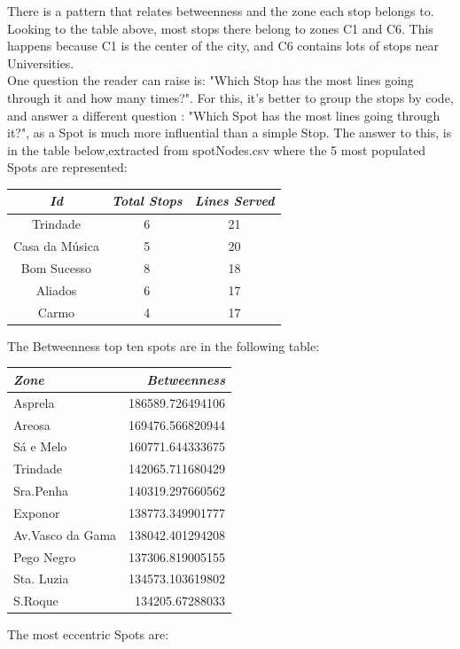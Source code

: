 \documentclass[12pt]{article}
\begin{document}
\begin{multicols}{2}
There is a pattern that relates betweenness and the zone each stop belongs to. Looking to the table above,  most stops there belong to zones C1 and C6. This happens because C1 is the center of the city, and C6 contains lots of stops near Universities.\\
One question the reader can raise is: "Which Stop has the most lines going through it and how many times?". For this, it's better to group the stops by code, and answer a different question : "Which Spot has the most lines going through it?", as a Spot is much more influential than a simple Stop. The answer to this, is in the table below,extracted from spotNodes.csv where the 5 most populated Spots are represented:
\begin{center}
\begin{tabular}[h]{ |c|c|c| }
\hline
    \em{Id}  & \em{Total Stops} & \em{Lines Served}\\
    \hline
    Trindade & 6  & 21 \\
    Casa da Música & 5 & 20 \\
    Bom Sucesso  & 8 & 18 \\
    Aliados & 6 & 17 \\
    Carmo & 4 & 17 \\
\hline
\end{tabular}
\end{center}
The Betweenness top ten spots are in the following table:
\begin{center}
\begin{tabular}[h]{|l|r|}
\hline
\em{Zone} & \em{Betweenness}\\
\hline
Asprela & 186589.726494106\\
Areosa & 169476.566820944\\
Sá e Melo  & 160771.644333675\\
Trindade & 142065.711680429\\
Sra.Penha & 140319.297660562\\
Exponor & 138773.349901777\\
Av.Vasco da Gama & 138042.401294208\\
Pego Negro & 137306.819005155\\
Sta. Luzia & 134573.103619802\\
S.Roque & 134205.67288033\\
\hline
\end{tabular}
\end{center}
The most eccentric Spots are:\\

\end{multicols}
\end{document}
